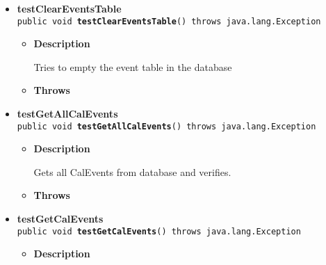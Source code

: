 \documentclass[11pt,a4paper]{report}
\begin{document}
{{{\begin{itemize}
{\begin{itemize}
{Tries to add events to the database
}
\item{{\bf  Throws}
}%
\end{itemize}
}%
\item{ 
{\bf  testClearEventsTable}\\
\texttt{public void\ {\bf  testClearEventsTable}() throws java.lang.Exception
\label{is.mpg.ruglan.test.DabbiTest.testClearEventsTable()}}%
\begin{itemize}
\item{
{\bf  Description}

Tries to empty the event table in the database
}
\item{{\bf  Throws}
}%
\end{itemize}
}%
\item{ 
{\bf  testGetAllCalEvents}\\
\texttt{public void\ {\bf  testGetAllCalEvents}() throws java.lang.Exception
\label{is.mpg.ruglan.test.DabbiTest.testGetAllCalEvents()}}%
\begin{itemize}
\item{
{\bf  Description}

Gets all CalEvents from database and verifies.
}
\item{{\bf  Throws}
}%
\end{itemize}
}%
\item{ 
{\bf  testGetCalEvents}\\
\texttt{public void\ {\bf  testGetCalEvents}() throws java.lang.Exception
\label{is.mpg.ruglan.test.DabbiTest.testGetCalEvents()}}%
\begin{itemize}
\item{
{\bf  Description}

}
\end{itemize}}
\end{itemize}}}}
\end{document}
